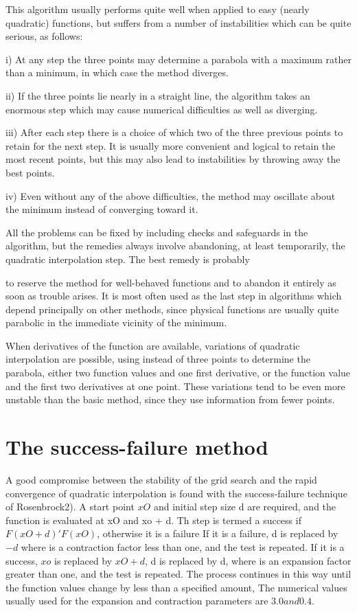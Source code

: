      This algorithm usually performs quite well when applied to easy
(nearly quadratic) functions, but suffers from a number of instabilities
which can be quite serious, as follows:
 
  i) At any step the three points may determine a parabola with a maximum
     rather than a minimum, in which case the method diverges.
 
 ii) If the three points lie nearly in a straight line, the algorithm
     takes an enormous step which may cause numerical difficulties as
     well as diverging.
 
iii) After each step there is a choice of which two of the three previous
     points to retain for the next step.  It is usually more convenient
     and logical to retain the most recent points, but this may also lead
     to instabilities by throwing away the best points.
 
 iv) Even without any of the above difficulties, the method may oscillate
     about the minimum instead of converging toward it.
 
     All the problems can be fixed by including checks and safeguards in
the algorithm, but the remedies always involve abandoning, at least
temporarily, the quadratic interpolation
 step.  The best remedy is probably
 
 
to reserve the method for well-behaved functions and to abandon it
entirely as soon as trouble arises.  It is most often used as the last
step in algorithms which depend principally on other methods, since
physical functions are usually quite parabolic in the immediate
vicinity of the minimum.
 
     When derivatives of the function are available, variations of
quadratic interpolation are possible, using instead of three points to
determine the parabola, either two function values and one first
derivative, or the function value and the first two derivatives at one
point. These
variations tend to be even more unstable than the basic method, since
they use information from fewer points.
 
 
\section{The success-failure method}
 
     A good compromise between the stability of the grid search and the
rapid convergence of quadratic interpolation is found with the
success-failure
 technique of Rosenbrock2).  A start point $xO$ and initial step size
d are required, and the function is evaluated at xO and xo + d.  Th
step is termed a success if $F(xO + d) ' F(xO)$, otherwise it is a failure
If it is a failure, d is replaced by $-d$ where  is a contraction factor
less than one, and the test is repeated.  If it is a success, $xo$ is
replaced by $xO + d$, d is replaced by d, where  is an expansion factor
greater than one, and the test is repeated.  The process continues in
this way until the function values change by less than a specified amount,
The numerical values usually used for the expansion and contraction
parameters are $ 3.0 and   0.4.$
 
